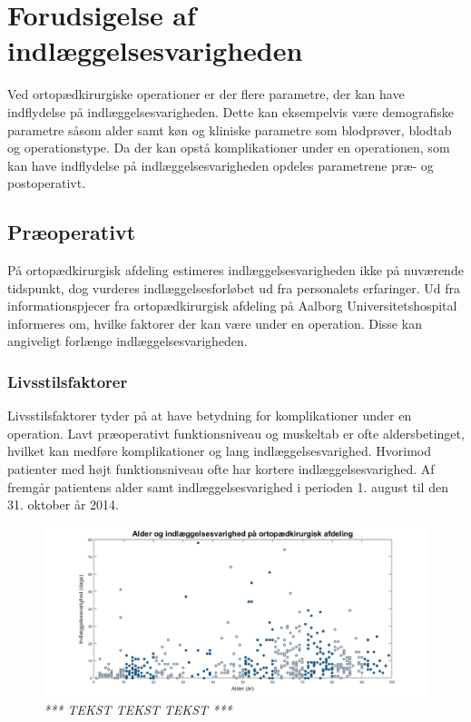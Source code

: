 \section{Forudsigelse af indlæggelsesvarigheden}
Ved ortopædkirurgiske operationer er der flere parametre, der kan have indflydelse på
indlæggelsesvarigheden. Dette kan eksempelvis være demografiske parametre såsom
alder samt køn og kliniske parametre som blodprøver, blodtab og operationstype. Da
der kan opstå komplikationer under en operationen, som kan have indflydelse på
indlæggelsesvarigheden opdeles parametrene præ- og postoperativt.


\subsection{Præoperativt}
På ortopædkirurgisk afdeling estimeres indlæggelsesvarigheden ikke på nuværende tidspunkt, dog vurderes indlæggelsesforløbet ud fra personalets erfaringer. Ud fra informationspjecer fra ortopædkirurgisk afdeling på Aalborg Universitetshospital informeres om, hvilke faktorer der kan være under en operation. Disse kan angiveligt forlænge indlæggelsesvarigheden. 


\subsubsection{Livsstilsfaktorer}
Livsstilsfaktorer tyder på at have betydning for komplikationer under en operation. Lavt præoperativt funktionsniveau og muskeltab er ofte aldersbetinget, hvilket kan medføre komplikationer og lang indlæggelsesvarighed. Hvorimod patienter med højt funktionsniveau ofte har kortere indlæggelsesvarighed.\cite{Kehlet2001, Janssen2002} Af  fremgår patientens alder samt indlæggelsesvarighed i perioden 1. august til den 31. oktober år 2014.


\begin{figure}[H]
	\centering
	\includegraphics[scale=0.55]{figures/alderogindlaeg}
	\caption{\textit{ *** TEKST TEKST TEKST *** }}
	\label{alderogindlaeggelse}
\end{figure}


